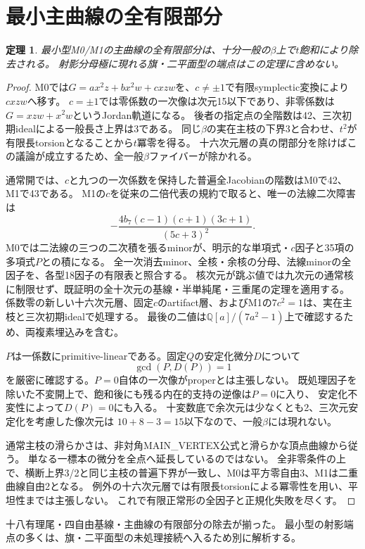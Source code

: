 \documentclass[11pt,a4paper]{ltjsarticle}
\newtheorem{theorem}{定理}[section]
\theoremstyle{remark}
\begin{document}
\section{最小主曲線の全有限部分}
\begin{theorem}
最小型M0/M1の主曲線の全有限部分は、十分一般の$\beta$上で$t$飽和により除去される。
射影分母極に現れる旗・二平面型の端点はこの定理に含めない。
\end{theorem}
\begin{proof}
M0では$G=ax^2z+bx^2w+cxzw$を、$c\ne\pm1$で有限symplectic変換により$cxzw$へ移す。
$c=\pm1$では零係数の一次像は次元15以下であり、非零係数は$G=xzw+x^2w$というJordan軌道になる。
後者の指定点の全階数は42、三次初期idealによる一般長さ上界は3である。
同じ$\beta$の実在主枝の下界3と合わせ、$t^2$が有限長torsionとなることから$t$冪零を得る。
十六次元層の真の閉部分を除けばこの議論が成立するため、全一般$\beta$ファイバーが除かれる\cite{main-jordan-v41}。

通常開では、$c$と九つの一次係数を保持した普遍全Jacobianの階数はM0で42、M1で43である。
M1の$c$を従来の二倍代表の規約で取ると、唯一の法線二次障害は
\[
 -\frac{4b_7(c-1)(c+1)(3c+1)}{(5c+3)^2}.
\]
M0では二法線の三つの二次積を張るminorが、明示的な単項式・$c$因子と35項の多項式$P$との積になる。
全一次消去minor、全核・余核の分母、法線minorの全因子を、各型18因子の有限表と照合する。
核次元が跳ぶ値では九次元の通常核に制限せず、既証明の全十次元の基線・半単純尾・三重尾の定理を適用する。
係数零の新しい十六次元層、固定$c$のartifact層、およびM1の$7c^2=1$は、実在主枝と三次初期idealで処理する。
最後の二値は$\mathbb Q[a]/(7a^2-1)$上で確認するため、両複素埋込みを含む。

$P$は一係数にprimitive-linearである。固定$Q$の安定化微分$D$について
\[
 \gcd(P,D(P))=1
\]
を厳密に確認する。$P=0$自体の一次像がproperとは主張しない。
既処理因子を除いた不変開上で、飽和後にも残る内在的支持の逆像は$P=0$に入り、
安定化不変性によって$D(P)=0$にも入る。
十変数底で余次元は少なくとも2、三次元安定化を考慮した像次元は
$10+8-3=15$以下なので、一般$\beta$には現れない。

通常主枝の滑らかさは、非対角MAIN\_VERTEX公式と滑らかな頂点曲線から従う。
単なる一標本の微分を全点へ延長しているのではない。
全非零条件の上で、横断上界3/2と同じ主枝の普遍下界が一致し、M0は平方零自由3、M1は二重曲線自由2となる。
例外の十六次元層では有限長torsionによる冪零性を用い、平坦性までは主張しない。
これで有限正常形の全因子と正規化失敗を尽くす\cite{main-all-v41}。
\end{proof}
十八有理尾・四自由基線・主曲線の有限部分の除去が揃った。
最小型の射影端点の多くは、旗・二平面型の未処理接続へ入るため別に解析する。
\end{document}
